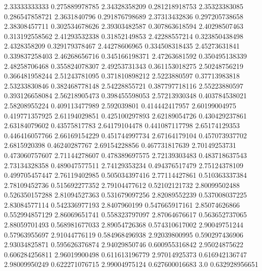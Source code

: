   2.33333333333   0.275889978785
  2.34328358209   0.281218918753
  2.35323383085   0.286547858721
   2.3631840796   0.291876798689
  2.37313432836   0.297205738658
  2.38308457711   0.302534678626
  2.39303482587   0.307863618594
  2.40298507463   0.313192558562
  2.41293532338    0.31852149853
  2.42288557214   0.323850438498
   2.4328358209   0.329179378467
  2.44278606965   0.334508318435
  2.45273631841   0.339837258403
  2.46268656716   0.345166198371
  2.47263681592   0.350495138339
  2.48258706468   0.355824078307
  2.49253731343   0.361153018275
  2.50248756219   0.366481958244
  2.51243781095   0.371810898212
   2.5223880597    0.37713983818
  2.53233830846   0.382468778148
  2.54228855721   0.387797718116
  2.55223880597   0.393126658084
  2.56218905473   0.398455598053
  2.57213930348   0.403784538021
  2.58208955224   0.409113477989
    2.592039801   0.414442417957
  2.60199004975   0.419771357925
  2.61194029851   0.425100297893
  2.62189054726   0.430429237861
  2.63184079602    0.43575817783
  2.64179104478   0.441087117798
  2.65174129353   0.446416057766
  2.66169154229   0.451744997734
  2.67164179104   0.457073937702
   2.6815920398    0.46240287767
  2.69154228856   0.467731817639
  2.70149253731   0.473060757607
  2.71144278607   0.478389697575
  2.72139303483   0.483718637543
  2.73134328358   0.489047577511
  2.74129353234   0.494376517479
  2.75124378109   0.499705457447
  2.76119402985   0.505034397416
  2.77114427861   0.510363337384
  2.78109452736   0.515692277352
  2.79104477612    0.52102121732
  2.80099502488   0.526350157288
  2.81094527363   0.531679097256
  2.82089552239   0.537008037225
  2.83084577114   0.542336977193
   2.8407960199   0.547665917161
  2.85074626866   0.552994857129
  2.86069651741   0.558323797097
  2.87064676617   0.563652737065
  2.88059701493   0.568981677033
  2.89054726368   0.574310617002
  2.90049751244    0.57963955697
  2.91044776119   0.584968496938
  2.92039800995   0.590297436906
  2.93034825871   0.595626376874
  2.94029850746   0.600955316842
  2.95024875622   0.606284256811
  2.96019900498   0.611613196779
  2.97014925373   0.616942136747
  2.98009950249   0.622271076715
  2.99004975124   0.627600016683
            3.0   0.632928956651
